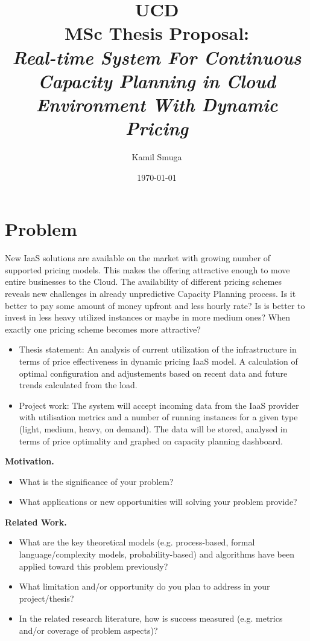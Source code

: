 \documentclass[11pt]{artikel3}
\title{UCD
\\MSc Thesis Proposal:\\\emph{Real-time System For Continuous Capacity Planning in Cloud Environment With Dynamic Pricing}}
\author{Kamil Smuga}
\date{\today}
\begin{document}
\maketitle


\section{Problem}

New IaaS solutions are available on the market with growing number of supported pricing models. This makes the offering attractive enough to move entire businesses to the Cloud. The availability of different pricing schemes reveals new challenges in already unpredictive Capacity Planning process. Is it better to pay some amount of money upfront and less hourly rate? Is is better to invest in less heavy utilized instances or maybe in more medium ones? When exactly one pricing scheme becomes more attractive? 

\begin{itemize}
  \item Thesis statement: An analysis of current utilization of the infrastructure in terms of price effectiveness in dynamic pricing IaaS model. A calculation of optimal configuration and adjustements based on recent data and future trends calculated from the load. 
  \item Project work: The system will accept incoming data from the IaaS provider with utilisation metrics and a number of running instances for a given type (light, medium, heavy, on demand). The data will be stored, analysed in terms of price optimality and graphed on capacity planning dashboard.
\end{itemize}


{\bf Motivation.} 
\begin{itemize}
  \item What is the significance of your problem? 
  \item What applications or new opportunities will solving your problem provide?
\end{itemize}


{\bf Related Work.}
\begin{itemize}
  \item What are the key theoretical models (e.g. process-based, formal language/complexity models, probability-based) and algorithms have been applied toward this problem previously? 
  \item What limitation and/or opportunity do you plan to address in your project/thesis?
  \item
In the related research literature, how is success measured (e.g. metrics and/or coverage of problem aspects)?
\end{itemize}
\end{document}

